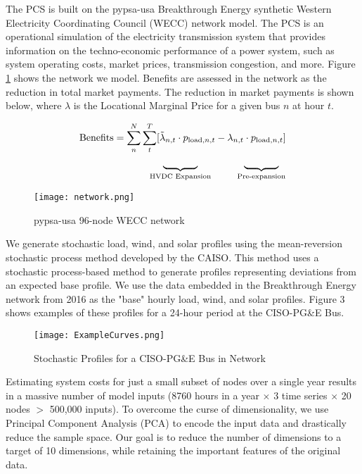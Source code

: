 \documentclass[10pt,twocolumn,letterpaper]{article}
\begin{document}
The PCS is built on the pypsa-usa Breakthrough Energy synthetic Western Electricity Coordinating Council (WECC) network model\cite{xu_us_2020}. The PCS is an operational simulation of the electricity transmission system that provides information on the techno-economic performance of a power system, such as system operating costs, market prices, transmission congestion, and more. Figure \ref{fig:network} shows the network we model. Benefits are assessed in the network as the reduction in total market payments. The reduction in market payments is shown below, where $\lambda$ is the Locational Marginal Price for a given bus $n$ at hour $t$.

\begin{align*}
    \text{Benefits} &= \sum^N_n \sum^T_t [\tilde{\lambda}_{n,t} \cdot p_{\text{load},n,t} - \lambda_{n,t} \cdot p_{\text{load},n,t}] \\
    &\hspace{3.5em}\underbrace{\phantom{\text{Benefits}}}_{\text{HVDC Expansion}} \hspace{2.5em} \underbrace{\phantom{\text{Benefits}}}_{\text{Pre-expansion}}
\end{align*}
    

\begin{figure}[!h]
    \centering
    \texttt{[image: network.png]}
    \caption{pypsa-usa 96-node WECC network}
    \label{fig:network}
\end{figure}

We generate stochastic load, wind, and solar profiles using the mean-reversion stochastic process method developed by the CAISO\cite{liu_order_nodate,liu_stochastic_2016}. This method uses a stochastic process-based method to generate profiles representing deviations from an expected base profile. We use the data embedded in the Breakthrough Energy network from 2016 as the "base" hourly load, wind, and solar profiles. Figure 3 shows examples of these profiles for a 24-hour period at the CISO-PG\&E Bus.

\begin{figure}[!h]
    \centering
    \texttt{[image: ExampleCurves.png]}
    \caption{Stochastic Profiles for a CISO-PG\&E Bus in Network}
    \label{fig:enter-label}
\end{figure}

Estimating system costs for just a small subset of nodes over a single year results in a massive number of model inputs (8760 hours in a year $\times$ 3 time series $\times$ 20 nodes $>$ 500,000 inputs). To overcome the curse of dimensionality, we use Principal Component Analysis (PCA) to encode the input data and drastically reduce the sample space. Our goal is to reduce the number of dimensions to a target of 10 dimensions, while retaining the important features of the original data. 
\end{document}
